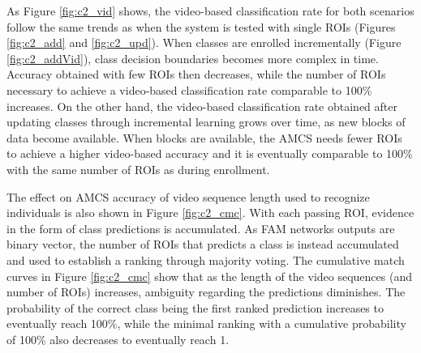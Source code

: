 As Figure \ref{fig:c2_vid} shows, the video-based classification rate for both scenarios follow the same trends as when the system is tested with single ROIs (Figures \ref{fig:c2_add} and \ref{fig:c2_upd}).
When classes are enrolled incrementally (Figure \ref{fig:c2_addVid}), class decision boundaries becomes more complex in time.
Accuracy obtained with few ROIs then decreases, while the number of ROIs necessary to achieve a video-based classification rate comparable to 100\% increases.
On the other hand, the video-based classification rate obtained after updating classes through incremental learning grows over time, as new blocks of data become available.
When blocks are available, the AMCS needs fewer ROIs to achieve a higher video-based accuracy and it is eventually comparable to 100\% with the same number of ROIs as during enrollment.

The effect on AMCS accuracy of video sequence length used to recognize individuals is also shown in Figure \ref{fig:c2_cmc}.
With each passing ROI, evidence in the form of class predictions is accumulated.
As FAM networks outputs are binary vector, the number of ROIs that predicts a class is instead accumulated and used to establish a ranking through majority voting.
The cumulative match curves in Figure \ref{fig:c2_cmc} show that as the length of the video sequences (and number of ROIs) increases, ambiguity regarding the predictions diminishes.
The probability of the correct class being the first ranked prediction increases to eventually reach 100\%, while the minimal ranking with a cumulative probability of 100\% also decreases to eventually reach 1.

\begin{figure*}[t]
  \centering
	\caption{Cumulative Match Curves the AMCS's ensemble for different number of ROIs used to perform face recognition.
Performance is shown after incremental learning of all the IIT-NRC data base, under both scenarios for the AMCS with LBESTS$_\text{+d}$.
Error bars correspond to the 90\% confidence interval}
	\label{fig:c2_cmc}
\end{figure*}

